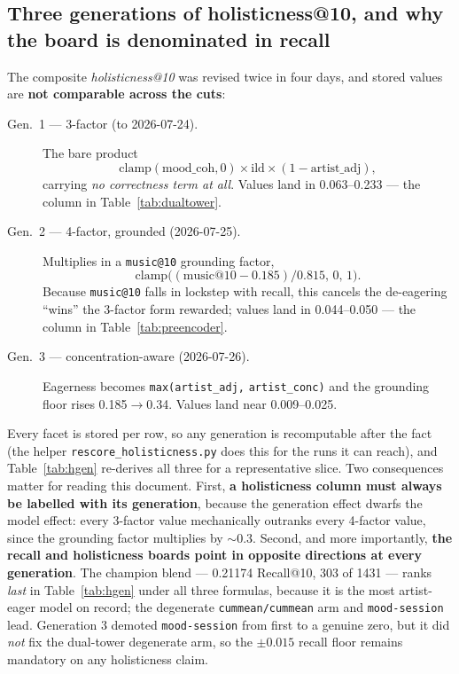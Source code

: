\documentclass[11pt]{article}
\begin{document}
\subsection{Three generations of holisticness@10, and why the board is denominated in recall}
\label{sec:power-generations}
The composite \emph{holisticness@10} was revised twice in four days, and stored
values are \textbf{not comparable across the cuts}:
\begin{description}
  \item[Gen.\ 1 --- 3-factor (to 2026-07-24).] The bare product
  \[\mathrm{clamp}(\text{mood\_coh},0)\times\text{ild}\times(1-\text{artist\_adj}),\]
  carrying \emph{no correctness term at all}. Values land in
  \numrange{0.063}{0.233} --- the column in Table~\ref{tab:dualtower}.
  \item[Gen.\ 2 --- 4-factor, grounded (2026-07-25).] Multiplies in a
  \texttt{music@10} grounding factor,
  \[\mathrm{clamp}\bigl((\text{music@10}-\num{0.185})/\num{0.815},\,0,\,1\bigr).\]
  Because \texttt{music@10} falls in lockstep with recall, this cancels the
  de-eagering ``wins'' the 3-factor form rewarded; values land in
  \numrange{0.044}{0.050} --- the column in Table~\ref{tab:preencoder}.
  \item[Gen.\ 3 --- concentration-aware (2026-07-26).] Eagerness becomes
  \texttt{max(artist\_adj,} \texttt{artist\_conc)} and the grounding floor
  rises \num{0.185}$\to$\num{0.34}. Values land near \numrange{0.009}{0.025}.
\end{description}
Every facet is stored per row, so any generation is recomputable after the fact
(the helper \texttt{rescore\_holisticness.py} does this for the runs it can
reach),
and Table~\ref{tab:hgen} re-derives all three for a representative slice. Two
consequences matter for reading this document. First, \textbf{a holisticness
column must always be labelled with its generation}, because the generation
effect dwarfs the model effect: every 3-factor value mechanically outranks every
4-factor value, since the grounding factor multiplies by ${\sim}0.3$. Second,
and more importantly, \textbf{the recall and holisticness boards point in
opposite directions at every generation}. The champion blend --- \num{0.21174}
Recall@10, \num{303} of \num{1431} --- ranks \emph{last} in
Table~\ref{tab:hgen} under all three formulas, because it is the most
artist-eager model on record; the degenerate \texttt{cummean/cummean} arm and
\texttt{mood-session} lead. Generation 3 demoted \texttt{mood-session} from
first to a genuine zero, but it did \emph{not} fix the dual-tower degenerate arm,
so the $\pm\num{0.015}$ recall floor remains mandatory on any holisticness claim.
\end{document}
